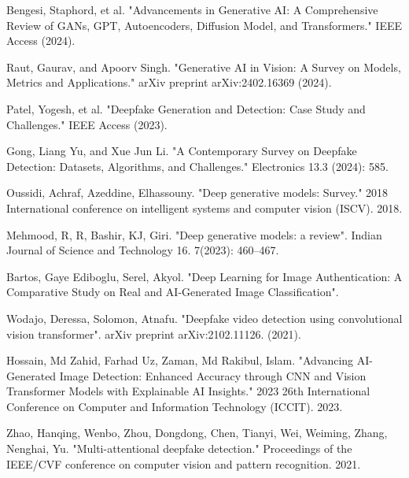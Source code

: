 \documentclass{svproc}
\begin{document}
%
%
\begin{thebibliography}{6}
%

Bengesi, Staphord, et al. "Advancements in Generative AI: A Comprehensive Review of GANs, GPT, Autoencoders, Diffusion Model, and Transformers." IEEE Access (2024).

Raut, Gaurav, and Apoorv Singh. "Generative AI in Vision: A Survey on Models, Metrics and Applications." arXiv preprint arXiv:2402.16369 (2024).

Patel, Yogesh, et al. "Deepfake Generation and Detection: Case Study and Challenges." IEEE Access (2023).

Gong, Liang Yu, and Xue Jun Li. "A Contemporary Survey on Deepfake Detection: Datasets, Algorithms, and Challenges." Electronics 13.3 (2024): 585.










Oussidi, Achraf, Azeddine, Elhassouny. "Deep generative models: Survey." 2018 International conference on intelligent systems and computer vision (ISCV). 2018.

Mehmood, R, R, Bashir, KJ, Giri. "Deep generative models: a review". Indian Journal of Science and Technology 16. 7(2023): 460–467.

Bartos, Gaye Ediboglu, Serel, Akyol. "Deep Learning for Image Authentication: A Comparative Study on Real and AI-Generated Image Classification". 

Wodajo, Deressa, Solomon, Atnafu. "Deepfake video detection using convolutional vision transformer". arXiv preprint arXiv:2102.11126. (2021).

Hossain, Md Zahid, Farhad Uz, Zaman, Md Rakibul, Islam. "Advancing AI-Generated Image Detection: Enhanced Accuracy through CNN and Vision Transformer Models with Explainable AI Insights." 2023 26th International Conference on Computer and Information Technology (ICCIT). 2023.

Zhao, Hanqing, Wenbo, Zhou, Dongdong, Chen, Tianyi, Wei, Weiming, Zhang, Nenghai, Yu. "Multi-attentional deepfake detection." Proceedings of the IEEE/CVF conference on computer vision and pattern recognition. 2021.


\end{thebibliography}
\end{document}
